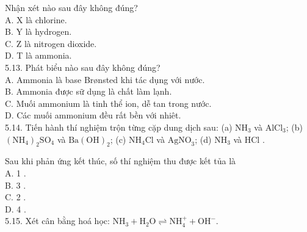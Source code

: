 \documentclass[10pt]{article}
\begin{document}
Nhận xét nào sau đây không đúng?\\
A. X là chlorine.\\
B. Y là hydrogen.\\
C. Z là nitrogen dioxide.\\
D. T là ammonia.\\
5.13. Phát biểu nào sau đây không đúng?\\
A. Ammonia là base Brønsted khi tác dụng với nước.\\
B. Ammonia được sữ dụng là chất làm lạnh.\\
C. Muối ammonium là tinh thể ion, dễ tan trong nước.\\
D. Các muối ammonium đều rất bền với nhiêt.\\
5.14. Tiến hành thí nghiệm trộn từng cặp dung dịch sau: (a) $\mathrm{NH}_{3}$ và $\mathrm{AlCl}_{3}$; (b) $\left(\mathrm{NH}_{4}\right)_{2} \mathrm{SO}_{4}$ và $\mathrm{Ba}(\mathrm{OH})_{2}$; (c) $\mathrm{NH}_{4} \mathrm{Cl}$ và $\mathrm{AgNO}_{3}$; (d) $\mathrm{NH}_{3}$ và HCl .

Sau khi phản ứng kết thúc, số thí nghiệm thu được kết tủa là\\
A. 1 .\\
B. 3 .\\
C. 2 .\\
D. 4 .\\
5.15. Xét cân bằng hoá học: $\mathrm{NH}_{3}+\mathrm{H}_{2} \mathrm{O} \rightleftharpoons \mathrm{NH}_{4}^{+}+\mathrm{OH}^{-}$.
\end{document}
